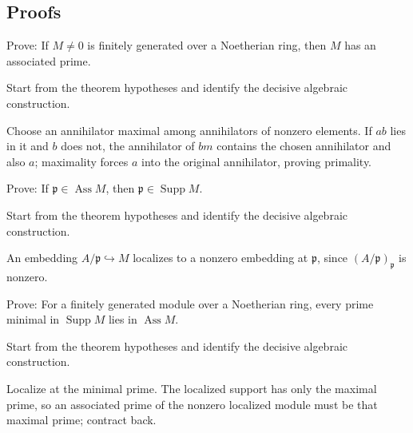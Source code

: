 \subsection*{Proofs}

\begin{exercise}\label{exr:v17-expand-06}
Prove: If $M\ne0$ is finitely generated over a Noetherian ring, then $M$ has an associated prime.
\end{exercise}
\begin{hint}
Start from the theorem hypotheses and identify the decisive algebraic construction.
\end{hint}
\begin{solution}
Choose an annihilator maximal among annihilators of nonzero elements. If $ab$ lies in it and $b$ does not, the annihilator of $bm$ contains the chosen annihilator and also $a$; maximality forces $a$ into the original annihilator, proving primality.
\end{solution}

\begin{exercise}\label{exr:v17-expand-07}
Prove: If $\mathfrak p\in\operatorname{Ass}M$, then $\mathfrak p\in\operatorname{Supp}M$.
\end{exercise}
\begin{hint}
Start from the theorem hypotheses and identify the decisive algebraic construction.
\end{hint}
\begin{solution}
An embedding $A/\mathfrak p\hookrightarrow M$ localizes to a nonzero embedding at $\mathfrak p$, since $(A/\mathfrak p)_{\mathfrak p}$ is nonzero.
\end{solution}

\begin{exercise}\label{exr:v17-expand-08}
Prove: For a finitely generated module over a Noetherian ring, every prime minimal in $\operatorname{Supp}M$ lies in $\operatorname{Ass}M$.
\end{exercise}
\begin{hint}
Start from the theorem hypotheses and identify the decisive algebraic construction.
\end{hint}
\begin{solution}
Localize at the minimal prime. The localized support has only the maximal prime, so an associated prime of the nonzero localized module must be that maximal prime; contract back.
\end{solution}

